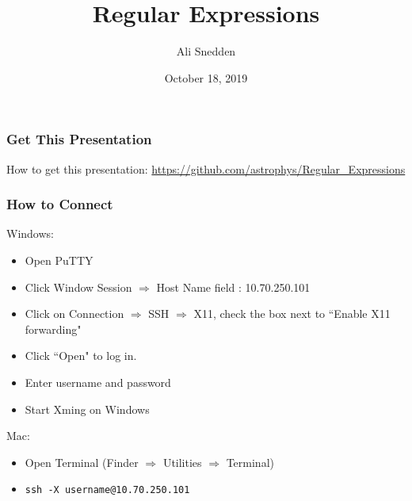 \documentclass{beamer}
\title{Regular Expressions}
\author{Ali Snedden}
\institute{Nationwide Children's Hospital}
\date{October 18, 2019}
\newcommand{\code}[1]{\colorbox{codegray}{\texttt{#1}}}
\begin{document}
 
\frame{\titlepage}


\begin{frame}
\frametitle{Get This Presentation}
How to get this presentation:
\bigskip
\href{https://github.com/astrophys/Regular\_Expressions}{https://github.com/astrophys/Regular\_Expressions}
\end{frame}


\begin{frame}
\frametitle{How to Connect}
Windows:
{\scriptsize
\begin{itemize}
    \item Open PuTTY
    \item Click Window Session $\Rightarrow$ Host Name field : 10.70.250.101
    \item Click on Connection $\Rightarrow$ SSH $\Rightarrow$ X11, check the box next to ``Enable X11 forwarding"
    \item Click ``Open" to log in.
    \item Enter username and password
    \item Start Xming on Windows
\end{itemize}
}
\bigskip

Mac:
{\scriptsize
\begin{itemize}
    \item Open Terminal (Finder $\Rightarrow$ Utilities $\Rightarrow$ Terminal)
    \item \code{ssh -X username@10.70.250.101}
\end{itemize}
}
\end{frame}
\end{document}
